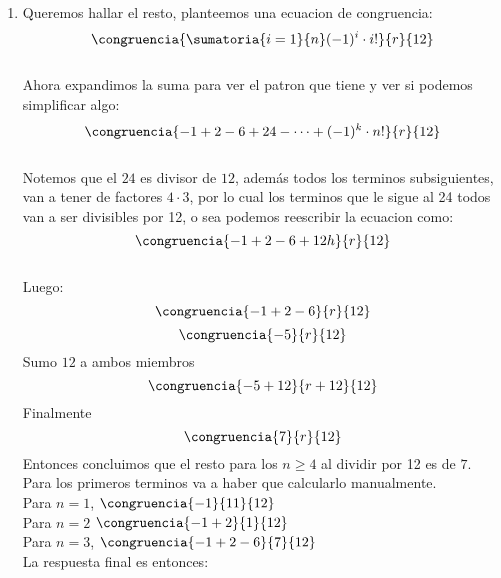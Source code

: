 \begin{enumerate}[label=\alph*)]
  \item Queremos hallar el resto, planteemos una ecuacion de congruencia:
        \[\congruencia{\sumatoria{i=1}{n} (-1)^i \cdot i!}{r}{12}\]
         \\
        Ahora expandimos la suma para ver el patron que tiene y ver si podemos simplificar algo: 
        \[\congruencia{-1+2-6+24-\cdots+(-1)^k\cdot n!}{r}{12}\] \\
        Notemos que el $24$ es divisor de $12$, además todos los terminos subsiguientes, van a tener de factores $4\cdot3$, por lo cual 
        los terminos que le sigue al 24 todos van a ser divisibles por 12, o sea podemos reescribir la ecuacion como:
        \[\congruencia{-1+2-6+12h}{r}{12}\] \\
        Luego:
        \[\congruencia{-1+2-6}{r}{12}\]
        \[\congruencia{-5}{r}{12}\]
        Sumo $12$ a ambos miembros 
        \[\congruencia{-5 + 12}{r + 12}{12}\]
        Finalmente
        \[\congruencia{7}{r}{12}\]
        Entonces concluimos que el resto para los $n \geq 4$ al dividir por 12 es de $7$. Para los primeros terminos
        va a haber que calcularlo manualmente. \\
        Para $n = 1$, $\congruencia{-1}{11}{12}$ \\
        Para $n = 2$ $\congruencia{-1 + 2}{1}{12}$ \\
        Para $n = 3$, $\congruencia{-1+2-6}{7}{12}$ \\
        La respuesta final es entonces: 

\end{enumerate}

\begin{aportes}
  \item {}
\end{aportes}
